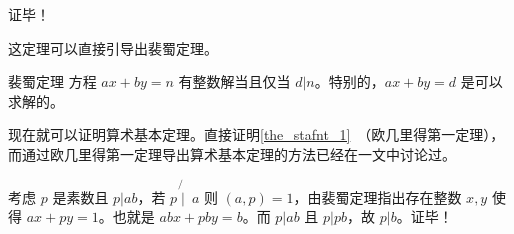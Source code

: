 证毕！

这定理可以直接引导出裴蜀定理。
\begin{theorem}{裴蜀定理}
方程 $ax + by = n$ 有整数解当且仅当 $d | n$。特别的，$ax+by = d$ 是可以求解的。
\end{theorem}

现在就可以证明算术基本定理。直接证明\autoref{the_stafnt_1}~（欧几里得第一定理），而通过欧几里得第一定理导出算术基本定理的方法已经在一文中讨论过。

考虑 $p$ 是素数且 $p|ab$，若 $p \not{\mid} ~ a$ 则 $(a, p) =1 $，由裴蜀定理指出存在整数 $x, y$ 使得 $ax+py = 1$。也就是 $abx + pby = b$。而 $p | ab$ 且 $p | pb$，故 $p | b$。证毕！